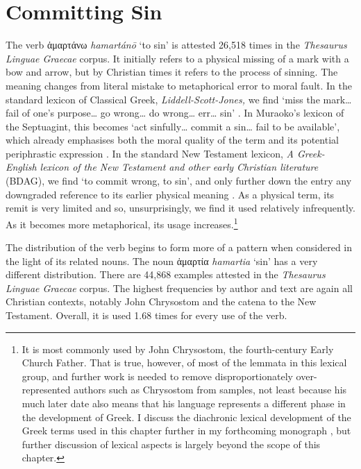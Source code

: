 \documentclass[output=paper,colorlinks,citecolor=brown]{langscibook}
\begin{document}
\section{Committing Sin}\label{committing-sinCR}

The verb ἁμαρτάνω \textit{hamartánō} ‘to sin' is attested 26,518 times in the \textit{Thesaurus Linguae Graecae} corpus. It
initially refers to a physical missing of a mark with a bow and arrow,
but by Christian times it refers to the process of sinning. 
The meaning
changes from literal mistake to metaphorical error to moral fault. 
In
the standard lexicon of Classical Greek, \emph{Liddell-Scott-Jones,} we find
`miss the mark\ldots{} fail of one's purpose\ldots{} go
wrong\ldots{} do wrong\ldots{} err\ldots{} sin' \citep{liddell_greek-english_1996}.
In Muraoko's lexicon of the Septuagint, this
becomes `act sinfully\ldots{} commit a sin\ldots{} fail to be
available', which already emphasises both the moral quality of the term
and its potential periphrastic expression \citep{muraoka_greek-english_2009}.
In
the standard New Testament lexicon, \textit{A Greek-English lexicon of the New Testament and other early Christian literature} (BDAG), we find `to commit
wrong, to sin', and only further down the entry any downgraded
reference to its earlier physical meaning \citep{arndt_greek-english_2000}.
As a physical term, its remit is very limited and so,
unsurprisingly, we find it used relatively infrequently. 
As it becomes
more metaphorical, its usage increases.\footnote{It is most commonly
  used by John Chrysostom, the fourth-century Early Church Father. 
  That
  is true, however, of most of the lemmata in this lexical group, and
  further work is needed to remove disproportionately over-represented
  authors such as Chrysostom from samples, not least because his much
  later date also means that his language represents a different phase
  in the development of Greek. 
  I discuss the diachronic lexical
  development of the Greek terms used in this chapter further in my
  forthcoming monograph \citep{ryan_translating_2025}, but further discussion of lexical
  aspects is largely beyond the scope of this chapter.}

The distribution of the verb begins to form more of a pattern when
considered in the light of its related nouns. 
The noun ἁμαρτία \textit{hamartia} ‘sin' has a
very different distribution. 
There are 44,868 examples attested in the
\textit{Thesaurus Linguae Graecae} corpus. 
The highest frequencies by author and text are again all
Christian contexts, notably John Chrysostom and the catena to the New
Testament. 
Overall, it is used 1.68 times for every use of the verb.
\end{document}
